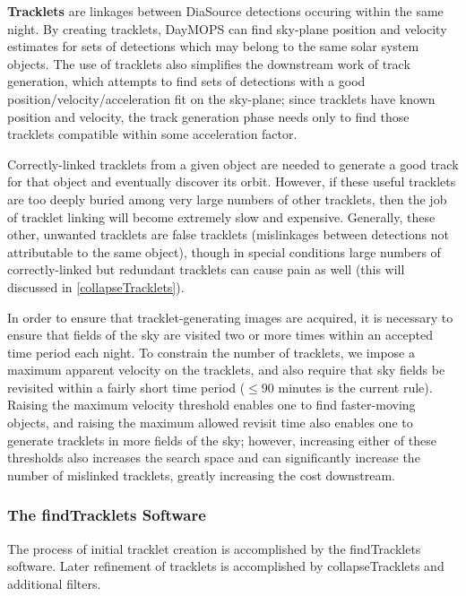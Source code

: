 \textbf{Tracklets} are linkages between DiaSource detections occuring
within the same night. By creating tracklets, DayMOPS can find
sky-plane position and velocity estimates for sets of detections which
may belong to the same solar system objects.  The use of tracklets
also simplifies the downstream work of track generation, which
attempts to find sets of detections with a good
position/velocity/acceleration fit on the sky-plane; since tracklets
have known position and velocity, the track generation phase needs
only to find those tracklets compatible within some acceleration
factor.

Correctly-linked tracklets from a given object are needed to generate
a good track for that object and eventually discover its orbit.
However, if these useful tracklets are too deeply buried among very
large numbers of other tracklets, then the job of tracklet linking
will become extremely slow and expensive.  Generally, these other,
unwanted tracklets are false tracklets (mislinkages between detections
not attributable to the same object), though in special conditions
large numbers of correctly-linked but redundant tracklets can cause
pain as well (this will discussed in \ref{collapseTracklets}).

In order to ensure that tracklet-generating images are acquired, it is
necessary to ensure that fields of the sky are visited two or more
times within an accepted time period each night. To constrain the
number of tracklets, we impose a maximum apparent velocity on the
tracklets, and also require that sky fields be revisited within a
fairly short time period ($\leq 90$ minutes is the current rule).
Raising the maximum velocity threshold enables one to find
faster-moving objects, and raising the maximum allowed revisit time
also enables one to generate tracklets in more fields of the sky;
however, increasing either of these thresholds also increases the
search space and can significantly increase the number of mislinked
tracklets, greatly increasing the cost downstream.




\subsubsection{The findTracklets Software}

The process of initial tracklet creation is accomplished by the
findTracklets software.  Later refinement of tracklets is accomplished
by collapseTracklets and additional filters.

